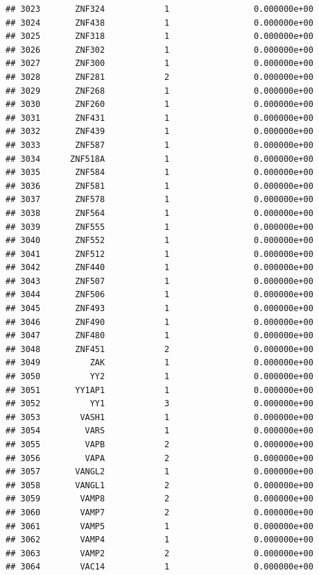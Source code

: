 \documentclass[
]{article}
\begin{document}
\begin{verbatim}
## 3023       ZNF324            1                 0.000000e+00
## 3024       ZNF438            1                 0.000000e+00
## 3025       ZNF318            1                 0.000000e+00
## 3026       ZNF302            1                 0.000000e+00
## 3027       ZNF300            1                 0.000000e+00
## 3028       ZNF281            2                 0.000000e+00
## 3029       ZNF268            1                 0.000000e+00
## 3030       ZNF260            1                 0.000000e+00
## 3031       ZNF431            1                 0.000000e+00
## 3032       ZNF439            1                 0.000000e+00
## 3033       ZNF587            1                 0.000000e+00
## 3034      ZNF518A            1                 0.000000e+00
## 3035       ZNF584            1                 0.000000e+00
## 3036       ZNF581            1                 0.000000e+00
## 3037       ZNF578            1                 0.000000e+00
## 3038       ZNF564            1                 0.000000e+00
## 3039       ZNF555            1                 0.000000e+00
## 3040       ZNF552            1                 0.000000e+00
## 3041       ZNF512            1                 0.000000e+00
## 3042       ZNF440            1                 0.000000e+00
## 3043       ZNF507            1                 0.000000e+00
## 3044       ZNF506            1                 0.000000e+00
## 3045       ZNF493            1                 0.000000e+00
## 3046       ZNF490            1                 0.000000e+00
## 3047       ZNF480            1                 0.000000e+00
## 3048       ZNF451            2                 0.000000e+00
## 3049          ZAK            1                 0.000000e+00
## 3050          YY2            1                 0.000000e+00
## 3051       YY1AP1            1                 0.000000e+00
## 3052          YY1            3                 0.000000e+00
## 3053        VASH1            1                 0.000000e+00
## 3054         VARS            1                 0.000000e+00
## 3055         VAPB            2                 0.000000e+00
## 3056         VAPA            2                 0.000000e+00
## 3057       VANGL2            1                 0.000000e+00
## 3058       VANGL1            2                 0.000000e+00
## 3059        VAMP8            2                 0.000000e+00
## 3060        VAMP7            2                 0.000000e+00
## 3061        VAMP5            1                 0.000000e+00
## 3062        VAMP4            1                 0.000000e+00
## 3063        VAMP2            2                 0.000000e+00
## 3064        VAC14            1                 0.000000e+00

\end{verbatim}
\end{document}
